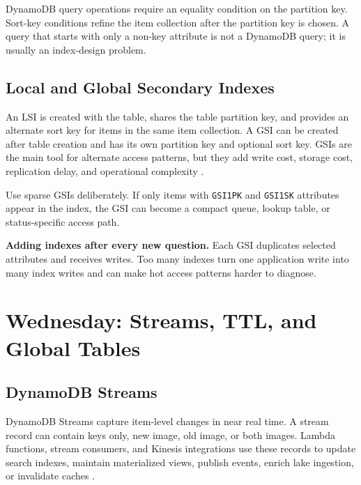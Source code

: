 \begin{notebox}
DynamoDB query operations require an equality condition on the partition key. Sort-key conditions refine the item collection after the partition key is chosen. A query that starts with only a non-key attribute is not a DynamoDB query; it is usually an index-design problem.
\end{notebox}

\subsection{Local and Global Secondary Indexes}
An LSI is created with the table, shares the table partition key, and provides an alternate sort key for items in the same item collection. A GSI can be created after table creation and has its own partition key and optional sort key. GSIs are the main tool for alternate access patterns, but they add write cost, storage cost, replication delay, and operational complexity \cite{awsDynamoDBSecondaryIndexes}.

\begin{tipbox}
Use sparse GSIs deliberately. If only items with \texttt{GSI1PK} and \texttt{GSI1SK} attributes appear in the index, the GSI can become a compact queue, lookup table, or status-specific access path.
\end{tipbox}

\begin{pitfall}
\textbf{Adding indexes after every new question.} Each GSI duplicates selected attributes and receives writes. Too many indexes turn one application write into many index writes and can make hot access patterns harder to diagnose.
\end{pitfall}

\section{Wednesday: Streams, TTL, and Global Tables}
\subsection{DynamoDB Streams}
DynamoDB Streams capture item-level changes in near real time. A stream record can contain keys only, new image, old image, or both images. Lambda functions, stream consumers, and Kinesis integrations use these records to update search indexes, maintain materialized views, publish events, enrich lake ingestion, or invalidate caches \cite{awsDynamoDBStreamsTTL}.

